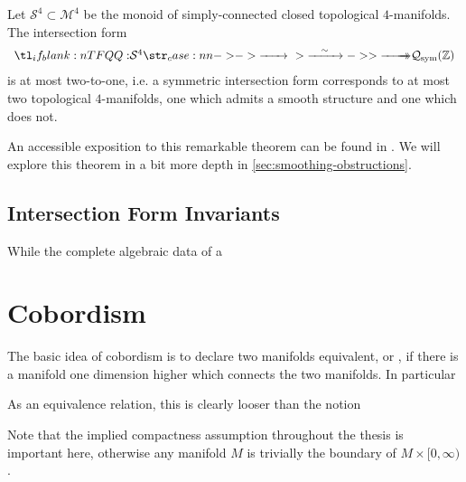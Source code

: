 \begin{theorem}[Freedman, 1982] Let $\mathcal{S}^4\subset \mathcal{M}^4$ be the monoid of simply-connected closed topological $4$-manifolds. The intersection form
	\[
		\lkxfunc{Q}{\mathcal{S}^4}{\mathcal{Q}_{\mathrm{sym}}(\Z)}
	\]
	is at most two-to-one, i.e. a symmetric intersection form corresponds to at most two topological $4$-manifolds, one which admits a smooth structure and one which does not.
\end{theorem}
An accessible exposition to this remarkable theorem can be found in \cite{behrens2021discembedding}. We will explore this theorem in a bit more depth in \cref{sec:smoothing-obstructions}.

\subsection{Intersection Form Invariants}\label{sec:intersection-form-invarians}

While the complete algebraic data of a 


\medskip
{}

\section{Cobordism}\label{sec:cobordism}

The basic idea of cobordism is to declare two manifolds equivalent, or , if there is a manifold one dimension higher which connects the two manifolds. In particular

As an equivalence relation, this is clearly looser than the notion

\begin{remark}
	Note that the implied compactness assumption throughout the thesis is important here, otherwise any manifold $M$ is trivially the boundary of $M\times [0,\infty)$.
\end{remark}

